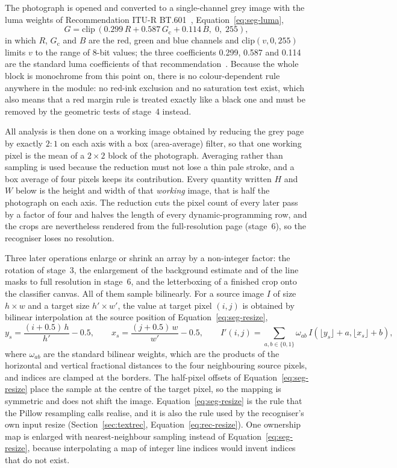 The photograph is opened and converted to a single-channel grey image with the luma weights of Recommendation ITU-R BT.601~\cite{itu601}, Equation~\ref{eq:seg-luma},
\begin{equation}
G=\mathrm{clip}\,(0.299\,R+0.587\,G_{\mathrm{c}}+0.114\,B,\;0,\;255),
\label{eq:seg-luma}
\end{equation}
in which $R$, $G_{\mathrm c}$ and $B$ are the red, green and blue channels and $\mathrm{clip}(v,0,255)$ limits $v$ to the range of 8-bit values; the three coefficients 0.299, 0.587 and 0.114 are the standard luma coefficients of that recommendation~\cite{itu601}.
Because the whole block is monochrome from this point on, there is no colour-dependent rule anywhere in the module: no red-ink exclusion and no saturation test exist, which also means that a red margin rule is treated exactly like a black one and must be removed by the geometric tests of stage~4 instead.

All analysis is then done on a working image obtained by reducing the grey page by exactly $2{:}1$ on each axis with a box (area-average) filter, so that one working pixel is the mean of a $2\times2$ block of the photograph.
Averaging rather than sampling is used because the reduction must not lose a thin pale stroke, and a box average of four pixels keeps its contribution.
Every quantity written $H$ and $W$ below is the height and width of that \emph{working} image, that is half the photograph on each axis.
The reduction cuts the pixel count of every later pass by a factor of four and halves the length of every dynamic-programming row, and the crops are nevertheless rendered from the full-resolution page (stage~6), so the recogniser loses no resolution.

Three later operations enlarge or shrink an array by a non-integer factor: the rotation of stage~3, the enlargement of the background estimate and of the line masks to full resolution in stage~6, and the letterboxing of a finished crop onto the classifier canvas.
All of them sample bilinearly.
For a source image $I$ of size $h\times w$ and a target size $h'\times w'$, the value at target pixel $(i,j)$ is obtained by bilinear interpolation at the source position of Equation~\ref{eq:seg-resize},
\begin{equation}
y_s=\frac{(i+0.5)\,h}{h'}-0.5,\qquad x_s=\frac{(j+0.5)\,w}{w'}-0.5,\qquad I'(i,j)=\sum_{a,b\in\{0,1\}}\omega_{ab}\,I(\lfloor y_s\rfloor+a,\lfloor x_s\rfloor+b),
\label{eq:seg-resize}
\end{equation}
where $\omega_{ab}$ are the standard bilinear weights, which are the products of the horizontal and vertical fractional distances to the four neighbouring source pixels, and indices are clamped at the borders.
The half-pixel offsets of Equation~\ref{eq:seg-resize} place the sample at the centre of the target pixel, so the mapping is symmetric and does not shift the image.
Equation~\ref{eq:seg-resize} is the rule that the Pillow resampling calls realise, and it is also the rule used by the recogniser's own input resize (Section~\ref{sec:textrec}, Equation~\ref{eq:rec-resize}).
One ownership map is enlarged with nearest-neighbour sampling instead of Equation~\ref{eq:seg-resize}, because interpolating a map of integer line indices would invent indices that do not exist.

